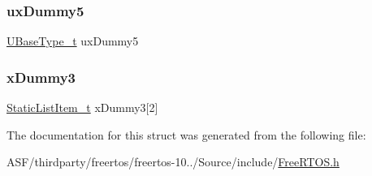 \mbox{\label{structx_s_t_a_t_i_c___t_c_b_a0e266307381fece384ea3b4499e69b6f}} 
\subsubsection{\texorpdfstring{uxDummy5}{uxDummy5}}
{\footnotesize\ttfamily \mbox{\hyperlink{portmacro_8h_a646f89d4298e4f5afd522202b11cb2e6}{U\+Base\+Type\+\_\+t}} ux\+Dummy5}

\mbox{\label{structx_s_t_a_t_i_c___t_c_b_acbd968fbd6059e44009bb84bbc25cb1d}} 
\subsubsection{\texorpdfstring{xDummy3}{xDummy3}}
{\footnotesize\ttfamily \mbox{\hyperlink{_free_r_t_o_s_8h_a1d31bc0472385a87424518da484d9e09}{Static\+List\+Item\+\_\+t}} x\+Dummy3\mbox{[}2\mbox{]}}



The documentation for this struct was generated from the following file\+:\begin{DoxyCompactItemize}
\item 
A\+S\+F/thirdparty/freertos/freertos-\/10../\+Source/include/\mbox{\hyperlink{_free_r_t_o_s_8h}{Free\+R\+T\+O\+S.\+h}}\end{DoxyCompactItemize}
